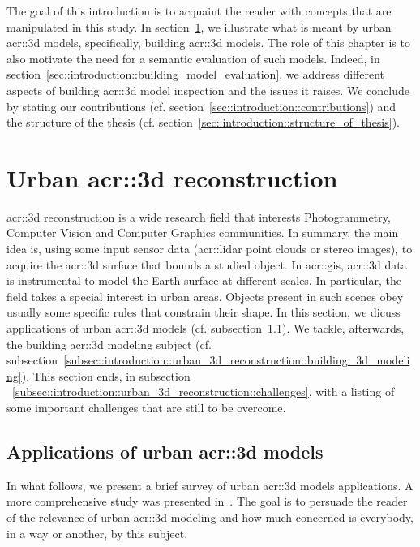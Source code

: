 \minitoc

\phantom{M}

The goal of this introduction is to acquaint the reader with concepts that are manipulated in this study.
In section~\ref{sec::introduction::urban_3d_reconstruction}, we illustrate what is meant by urban \gls{acr::3d} models, specifically,  building \gls{acr::3d} models.
The role of this chapter is to also motivate the need for a semantic evaluation of such models.
Indeed, in section~\ref{sec::introduction::building_model_evaluation}, we address different aspects of building \gls{acr::3d} model inspection and the issues it raises.
We conclude by stating our contributions (cf. section~\ref{sec::introduction::contributions}) and the structure of the thesis (cf. section~\ref{sec::introduction::structure_of_thesis}).

\section{Urban \gls{acr::3d} reconstruction}
    \label{sec::introduction::urban_3d_reconstruction}
    \gls{acr::3d} reconstruction is a wide research field that interests Photogrammetry, Computer Vision and Computer Graphics communities.
    In summary, the main idea is, using some input sensor data (\gls{acr::lidar} point clouds or stereo images), to acquire the \gls{acr::3d} surface that bounds a studied object.
    In \gls{acr::gis}, \gls{acr::3d} data is instrumental to model the Earth surface at different scales.
    In particular, the field takes a special interest in urban areas.
    Objects present in such scenes obey usually some specific rules that constrain their shape.
    In this section, we dicuss applications of urban \gls{acr::3d} models (cf. subsection~\ref{subsec::introduction::urban_3d_reconstruction::applications}).
    We tackle, afterwards, the  building \gls{acr::3d} modeling subject (cf. subsection~\ref{subsec::introduction::urban_3d_reconstruction::building_3d_modeling}).
    This section ends, in subsection ~\ref{subsec::introduction::urban_3d_reconstruction::challenges}, with a listing of some important challenges that are still to be overcome.

    \subsection{Applications of urban \acrshort{acr::3d} models}
        \label{subsec::introduction::urban_3d_reconstruction::applications}
        In what follows, we present a brief survey of  urban \gls{acr::3d} models applications.
        A more comprehensive study was presented in~\cite{ijgi4042842}.
        The goal is to persuade the reader of the relevance of urban \gls{acr::3d} modeling and how much concerned is everybody, in a way or another, by this subject.
